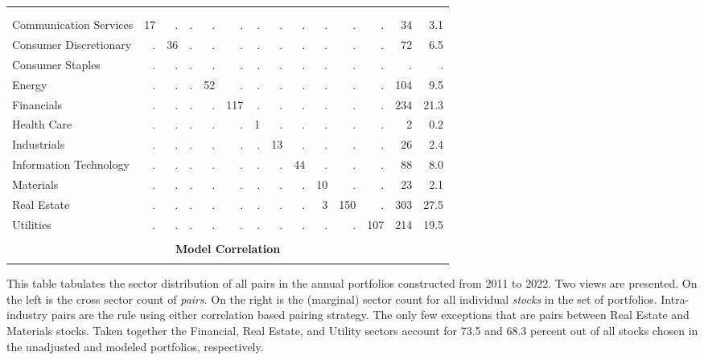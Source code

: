 \begin{table}[hp]
\begin{threeparttable}
\begin{tabular}{l r r r r r r r r r r r | r r}
          \vspace{1 mm} \\
                                   &    &    &    &    &    &    &    &    &    &    &    &     &       \\
          Communication Services   & 17 &  . &  . &  . &  . &  . &  . &  . &  . &  . &  . &  34 &  3.1 \\
          Consumer Discretionary   &  . & 36 &  . &  . &  . &  . &  . &  . &  . &  . &  . &  72 &  6.5 \\
          Consumer Staples         &  . &  . &  . &  . &  . &  . &  . &  . &  . &  . &  . &   . &    . \\
          Energy                   &  . &  . &  . & 52 &  . &  . &  . &  . &  . &  . &  . & 104 &  9.5 \\
          Financials               &  . &  . &  . &  . & 117&  . &  . &  . &  . &  . &  . & 234 & 21.3 \\
          Health Care              &  . &  . &  . &  . &  . &  1 &  . &  . &  . &  . &  . &   2 &  0.2 \\
          Industrials              &  . &  . &  . &  . &  . &  . & 13 &  . &  . &  . &  . &  26 &  2.4 \\
          Information Technology   &  . &  . &  . &  . &  . &  . &  . & 44 &  . &  . &  . &  88 &  8.0 \\
          Materials                &  . &  . &  . &  . &  . &  . &  . &  . & 10 &  . &  . &  23 &  2.1 \\
          Real Estate              &  . &  . &  . &  . &  . &  . &  . &  . &  3 &150 &  . & 303 & 27.5 \\
          Utilities                &  . &  . &  . &  . &  . &  . &  . &  . &  . &  . &107 & 214 & 19.5 \\
          \vspace{0.25 mm} \\
          \multicolumn{14}{c}{\textbf{Model Correlation}} \\
          \vspace{1 mm} \\
          \hline
      \end{tabular}
      \begin{tablenotes}
          \item{\footnotesize This table tabulates the sector distribution of all pairs in the annual portfolios constructed from 2011 to 2022. Two views are presented. On the left is the cross sector count of \textit{pairs}. On the right is the (marginal) sector count for all individual \textit{stocks} in the set of portfolios. Intra-industry pairs are the rule using either correlation based pairing strategy. The only few exceptions that are pairs between Real Estate and Materials stocks. Taken together the Financial, Real Estate, and Utility sectors account for 73.5 and 68.3 percent out of all stocks chosen in the unadjusted and modeled portfolios, respectively.}
      \end{tablenotes} 
    \end{threeparttable}
\end{table}


